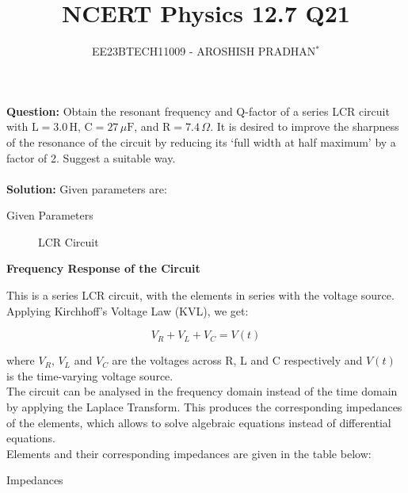 \documentclass[journal,12pt,twocolumn]{IEEEtran}
\theoremstyle{remark}
\begin{document}

\vspace{3cm}

\title{NCERT Physics 12.7 Q21}
\author{EE23BTECH11009 - AROSHISH PRADHAN$^{*}$%
}
\maketitle
\newpage
\bigskip
\textbf{Question:} 
Obtain the resonant frequency and Q-factor of a series LCR circuit
with $\text{L} = 3.0\, \text{H}$, $\text{C} = 27\, \mu\text{F}$, and $\text{R} = 7.4\, \Omega$. It is desired to improve the
sharpness of the resonance of the circuit by reducing its `full width at half maximum' by a factor of 2. Suggest a suitable way.\\
\\
\textbf{Solution: }
Given parameters are:

\begin{table}[h]
    \centering
    \resizebox{6 cm}{!}{
    }
    \vspace{6 pt}
    \caption{Given Parameters}
    \label{tab:my_label}
\end{table}

\begin{figure}[h]
 \centering
    
    \caption{LCR Circuit}
    \label{fig:enter-label}
\end{figure}

\textbf{Frequency Response of the Circuit}

This is a series LCR circuit, with the elements in series with the voltage source. Applying Kirchhoff's Voltage Law (KVL), we get:

\begin{equation}
V_R + V_L + V_C = V(t)
\end{equation}

where $V_R$, $V_L$ and $V_C$ are the voltages across R, L and C respectively and $V(t)$ is the time-varying voltage source.\\

The circuit can be analysed in the frequency domain instead of the time domain by applying the Laplace Transform. This produces the corresponding impedances of the elements, which allows to solve algebraic equations instead of differential equations.\\

Elements and their corresponding impedances are given in the table below:

\begin{table}[h]
    \centering
    \resizebox{6 cm}{!}{
    
    }
    \vspace{6 pt}
    \caption{Impedances}
    \label{tab:my_label} 
\end{table}
\end{document}
